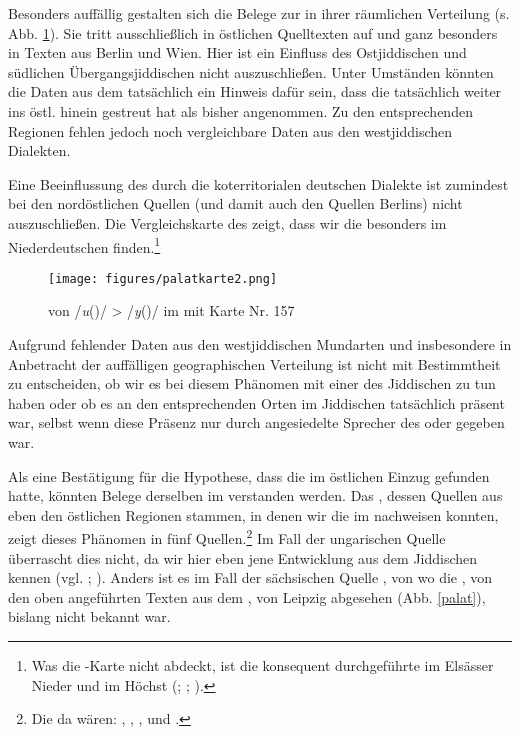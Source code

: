  Besonders auffällig gestalten sich die Belege zur  in ihrer räumlichen Verteilung (s. Abb. \ref{kartepalat}). Sie tritt ausschließlich in östlichen Quelltexten auf und ganz besonders in Texten aus Berlin und Wien. Hier ist ein Einfluss des Ostjiddischen und südlichen Übergangsjiddischen nicht auszuschließen. Unter Umständen könnten die Daten aus dem  tatsächlich ein Hinweis dafür sein, dass die  tatsächlich weiter ins östl.  hinein gestreut hat als bisher angenommen. Zu den entsprechenden Regionen fehlen jedoch noch vergleichbare Daten aus den westjiddischen Dialekten. 
 
 Eine Beeinflussung des  durch die koterritorialen deutschen Dialekte ist zumindest bei den nordöstlichen Quellen (und damit auch den Quellen Berlins) nicht auszuschließen. Die Vergleichskarte des  zeigt, dass wir die  besonders im Niederdeutschen finden.\footnote{Was die -Karte nicht abdeckt, ist die konsequent durchgeführte  im Elsässer Nieder und im Höchst (\cite[208–210]{Schirmunski1962}; \cite[831]{Wiesinger1983a}; \citeyear[1052]{Wiesinger1983b}).}

  \begin{figure}[h!]
		\centering
\texttt{[image: figures/palatkarte2.png]}
		\caption{\label{kartepalat}  von /\textit{u}(\textlengthmark)/ > /\textit{y}(\textlengthmark)/ im  mit  Karte Nr. 157}
		\end{figure}
\FloatBarrier
 
 
 Aufgrund fehlender Daten aus den westjiddischen Mundarten und insbesondere in Anbetracht der auffälligen geographischen Verteilung ist nicht mit Bestimmtheit zu entscheiden, ob wir es bei diesem Phänomen mit einer   des Jiddischen zu tun haben oder ob es an den entsprechenden Orten im Jiddischen tatsächlich präsent war, selbst wenn diese Präsenz nur durch angesiedelte Sprecher des  oder  gegeben war. 
 
Als eine Bestätigung für die Hypothese, dass die  im östlichen  Einzug gefunden hatte, könnten Belege derselben im  verstanden werden. Das , dessen Quellen aus eben den östlichen Regionen stammen, in denen wir die  im  nachweisen konnten, zeigt dieses Phänomen in fünf Quellen.\footnote{Die da wären: , , ,  und .} Im Fall der ungarischen Quelle  überrascht dies nicht, da wir hier eben jene Entwicklung aus dem Jiddischen kennen (vgl. \cite{Hutterer1965}; \cite[83]{Herzog1992}). Anders ist es im Fall der sächsischen Quelle , von wo die , von den oben angeführten Texten aus dem , von Leipzig abgesehen (Abb. \ref{palat}), bislang nicht bekannt war. \\
 

